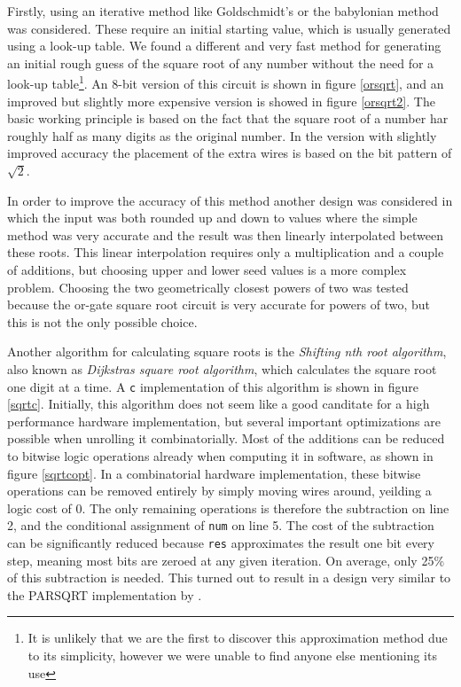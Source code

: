 			Firstly, using an iterative method like Goldschmidt's or the
			babylonian method was considered. These require an initial starting
			value, which is usually generated using a look-up table. We found a
			different and very fast method for generating an initial rough
			guess of the square root of any number without the need for a
			look-up table\footnote{It is unlikely that we are the first to
			discover this approximation method due to its simplicity, however
			we were unable to find anyone else mentioning its use}. An 8-bit
			version of this circuit is shown in figure \ref{orsqrt}, and an
			improved but slightly more expensive version is showed in figure
			\ref{orsqrt2}.  The basic working principle is based on the fact
			that the square root of a number har roughly half as many digits as
			the original number. In the version with slightly improved accuracy
			the placement of the extra wires is based on the bit pattern of
			$\sqrt{2}$.

			In order to improve the accuracy of this method another design was
			considered in which the input was both rounded up and down to 
			values where the simple method was very accurate and the result was
			then linearly interpolated between these roots. This linear 
			interpolation requires only a multiplication and a couple of 
			additions, but choosing upper and lower seed values is a more 
			complex problem. Choosing the two geometrically closest powers of 
			two was tested because the or-gate square root circuit is very
			accurate for powers of two, but this is not the only possible 
			choice.

			Another algorithm for calculating square roots is the
			\emph{Shifting nth root algorithm}, also known as \emph{Dijkstras
			square root algorithm}, which calculates the square root one digit
			at a time. A \texttt{c} implementation of this algorithm is shown
			in figure \ref{sqrtc}. Initially, this algorithm does not seem like
			a good canditate for a high performance hardware implementation,
			but several important optimizations are possible when unrolling it
			combinatorially. Most of the additions can be reduced to bitwise
			logic operations already when computing it in software, as shown in
			figure \ref{sqrtcopt}. In a combinatorial hardware implementation,
			these bitwise operations can be removed entirely by simply moving
			wires around, yeilding a logic cost of 0. The only remaining
			operations is therefore the subtraction on line 2, and the
			conditional assignment of \texttt{num} on line 5. The cost of the
			subtraction can be significantly reduced because \texttt{res}
			approximates the result one bit every step, meaning most bits are
			zeroed at any given iteration. On average, only 25\% of this
			subtraction is needed. This turned out to result in a design very
			similar to the PARSQRT implementation by \cite{japaneseSQRT}.
